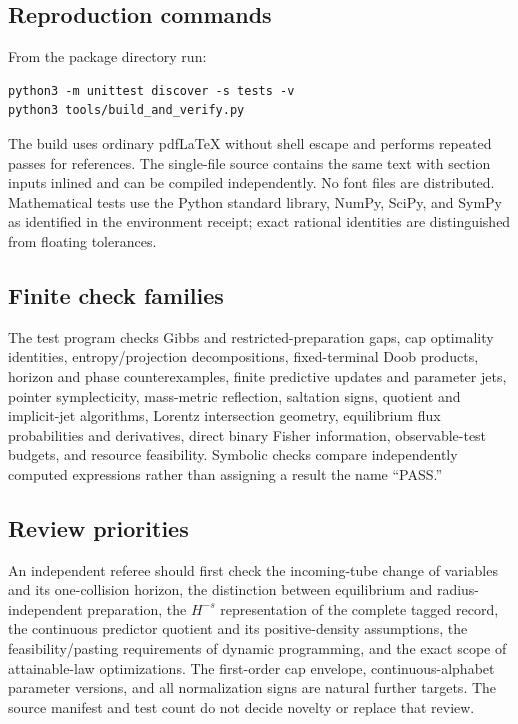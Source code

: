\subsection{Reproduction commands}
From the package directory run:
\begin{verbatim}
python3 -m unittest discover -s tests -v
python3 tools/build_and_verify.py
\end{verbatim}
The build uses ordinary pdfLaTeX without shell escape and performs repeated passes for references. The single-file source contains the same text with section inputs inlined and can be compiled independently. No font files are distributed. Mathematical tests use the Python standard library, NumPy, SciPy, and SymPy as identified in the environment receipt; exact rational identities are distinguished from floating tolerances.

\subsection{Finite check families}
The test program checks Gibbs and restricted-preparation gaps, cap optimality identities, entropy/projection decompositions, fixed-terminal Doob products, horizon and phase counterexamples, finite predictive updates and parameter jets, pointer symplecticity, mass-metric reflection, saltation signs, quotient and implicit-jet algorithms, Lorentz intersection geometry, equilibrium flux probabilities and derivatives, direct binary Fisher information, observable-test budgets, and resource feasibility. Symbolic checks compare independently computed expressions rather than assigning a result the name ``PASS.''

\subsection{Review priorities}
An independent referee should first check the incoming-tube change of variables and its one-collision horizon, the distinction between equilibrium and radius-independent preparation, the $H^{-s}$ representation of the complete tagged record, the continuous predictor quotient and its positive-density assumptions, the feasibility/pasting requirements of dynamic programming, and the exact scope of attainable-law optimizations. The first-order cap envelope, continuous-alphabet parameter versions, and all normalization signs are natural further targets. The source manifest and test count do not decide novelty or replace that review.
\par
